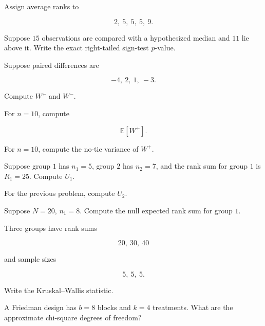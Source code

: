 \begin{exercise}[2]
Assign average ranks to

\[
2,\ 5,\ 5,\ 5,\ 9.
\]
\end{exercise}

\begin{exercise}[2]
Suppose \(15\) observations are compared with a hypothesized median and
\(11\) lie above it. Write the exact right-tailed sign-test \(p\)-value.
\end{exercise}

\begin{exercise}[2]
Suppose paired differences are

\[
-4,\ 2,\ 1,\ -3.
\]

Compute \(W^+\) and \(W^-\).
\end{exercise}

\begin{exercise}[2]
For \(n=10\), compute

\[
\mathbb{E}[W^+].
\]
\end{exercise}

\begin{exercise}[2]
For \(n=10\), compute the no-tie variance of \(W^+\).
\end{exercise}

\begin{exercise}[2]
Suppose group \(1\) has \(n_1=5\), group \(2\) has \(n_2=7\), and the
rank sum for group \(1\) is \(R_1=25\). Compute \(U_1\).
\end{exercise}

\begin{exercise}[2]
For the previous problem, compute \(U_2\).
\end{exercise}

\begin{exercise}[2]
Suppose \(N=20\), \(n_1=8\). Compute the null expected rank sum for group
\(1\).
\end{exercise}

\begin{exercise}[2]
Three groups have rank sums

\[
20,\ 30,\ 40
\]

and sample sizes

\[
5,\ 5,\ 5.
\]

Write the Kruskal--Wallis statistic.
\end{exercise}

\begin{exercise}[2]
A Friedman design has \(b=8\) blocks and \(k=4\) treatments. What are the
approximate chi-square degrees of freedom?
\end{exercise}

